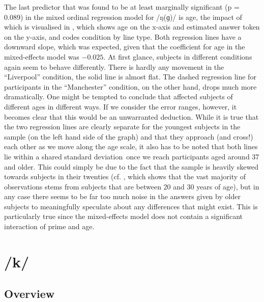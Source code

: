 The last predictor that was found to be at least marginally significant (p = 0.089) in the mixed ordinal regression model for /ŋ(ɡ)/ is age, the impact of which is visualised in , which shows age on the x-axis and estimated answer token on the y-axis, and codes  condition by line type.
Both regression lines have a downward slope, which was expected, given that the coefficient for age in the mixed-effects model was \ensuremath{-0.025}.
At first glance, subjects in different  conditions again seem to behave differently.
There is hardly any movement in the ``Liverpool'' condition, the solid line is almost flat.
The dashed regression line for participants in the ``Manchester'' condition, on the other hand, drops much more dramatically.
One might be tempted to conclude that  affected subjects of different ages in different ways.
If we consider the error ranges, however, it becomes clear that this would be an unwarranted deduction.
While it is true that the two regression lines are clearly separate for the youngest subjects in the sample (on the left hand side of the graph) and that they approach (and cross!) each other as we move along the age scale, it also has to be noted that both lines lie within a shared standard deviation\ once we reach participants aged around 37 and older.
This could simply be due to the fact that the sample is heavily skewed towards subjects in their twenties (cf. , which shows that the vast majority of observations stems from subjects that are between 20 and 30 years of age), but in any case there seems to be far too much noise in the answers given by older subjects to meaningfully speculate about any differences that might exist.
This is particularly true since the mixed-effects model does not contain a significant interaction of prime and age.

\section{/k/}
\label{sec.perc_res.k}
	\subsection{Overview}
	\label{sec.perc_res.k.overview}

